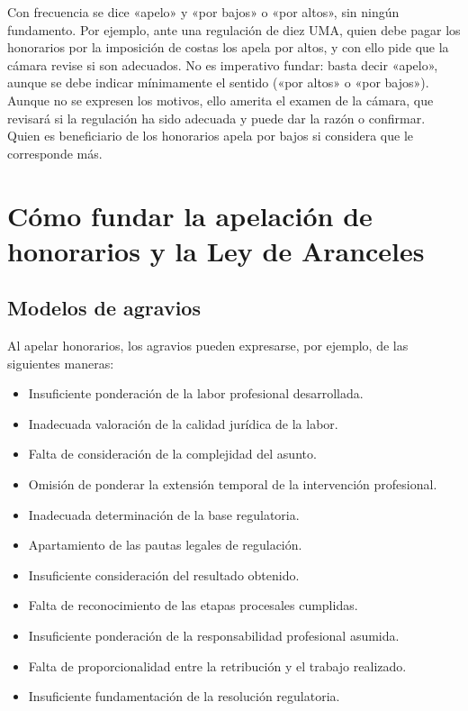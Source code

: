\documentclass[12pt,oneside]{book}
\begin{document}
Con frecuencia se dice «apelo» y «por bajos» o «por altos», sin ningún fundamento. Por ejemplo, ante una regulación de diez UMA, quien debe pagar los honorarios por la imposición de costas los apela por altos, y con ello pide que la cámara revise si son adecuados. No es imperativo fundar: basta decir «apelo», aunque se debe indicar mínimamente el sentido («por altos» o «por bajos»). Aunque no se expresen los motivos, ello amerita el examen de la cámara, que revisará si la regulación ha sido adecuada y puede dar la razón o confirmar. Quien es beneficiario de los honorarios apela por bajos si considera que le corresponde más.

\section{Cómo fundar la apelación de honorarios y la Ley de Aranceles}

\subsection{Modelos de agravios}

Al apelar honorarios, los agravios pueden expresarse, por ejemplo, de las siguientes maneras:

\begin{itemize}
    \item Insuficiente ponderación de la labor profesional desarrollada.
    \item Inadecuada valoración de la calidad jurídica de la labor.
    \item Falta de consideración de la complejidad del asunto.
    \item Omisión de ponderar la extensión temporal de la intervención profesional.
    \item Inadecuada determinación de la base regulatoria.
    \item Apartamiento de las pautas legales de regulación.
    \item Insuficiente consideración del resultado obtenido.
    \item Falta de reconocimiento de las etapas procesales cumplidas.
    \item Insuficiente ponderación de la responsabilidad profesional asumida.
    \item Falta de proporcionalidad entre la retribución y el trabajo realizado.
    \item Insuficiente fundamentación de la resolución regulatoria.
\end{itemize}
\end{document}
